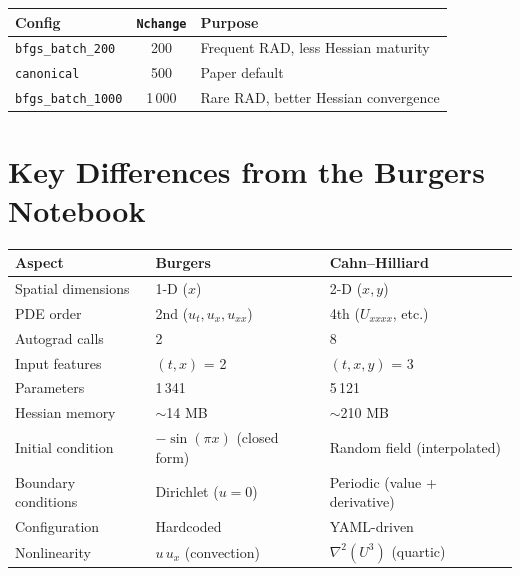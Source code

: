 \documentclass[11pt,a4paper]{article}
\begin{document}
\begin{center}
\begin{tabular}{@{}lcp{5cm}@{}}
\toprule
\textbf{Config} & \texttt{Nchange} & \textbf{Purpose} \\
\midrule
\texttt{bfgs\_batch\_200}  & 200   & Frequent RAD, less Hessian maturity \\
\texttt{canonical}          & 500   & Paper default \\
\texttt{bfgs\_batch\_1000} & 1\,000 & Rare RAD, better Hessian convergence \\
\bottomrule
\end{tabular}
\end{center}


\section{Key Differences from the Burgers Notebook}
\label{sec:differences}

\begin{center}
\renewcommand{\arraystretch}{1.3}
\begin{tabular}{@{}lll@{}}
\toprule
\textbf{Aspect} & \textbf{Burgers} & \textbf{Cahn--Hilliard} \\
\midrule
Spatial dimensions   & 1-D ($x$)              & 2-D ($x, y$) \\
PDE order            & 2nd ($u_t, u_x, u_{xx}$) & 4th ($U_{xxxx}$, etc.) \\
Autograd calls       & 2                       & 8 \\
Input features       & $(t, x)$ = 2            & $(t, x, y)$ = 3 \\
Parameters           & 1\,341                  & 5\,121 \\
Hessian memory       & $\sim$14 MB             & $\sim$210 MB \\
Initial condition    & $-\sin(\pi x)$ (closed form) & Random field (interpolated) \\
Boundary conditions  & Dirichlet ($u=0$)       & Periodic (value + derivative) \\
Configuration        & Hardcoded                & YAML-driven \\
Nonlinearity         & $u\,u_x$ (convection)   & $\nabla^2(U^3)$ (quartic) \\
\bottomrule
\end{tabular}
\end{center}
\end{document}
